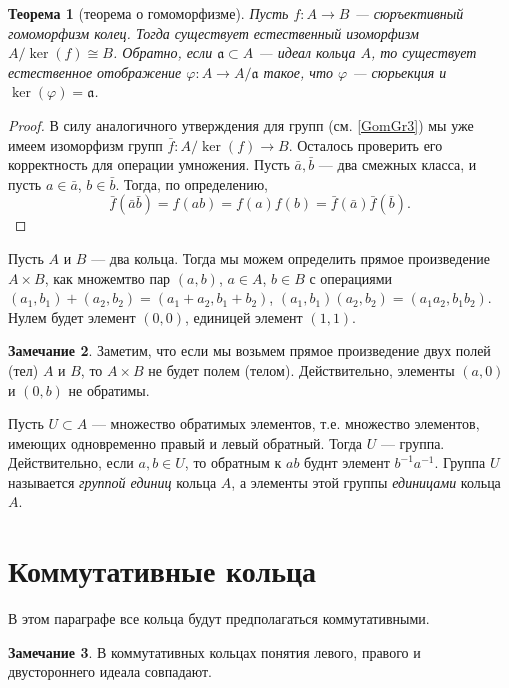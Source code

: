 \documentclass[12pt, titlepage, oneside]{amsbook}
\newcommand{\aaa}{\mathfrak{a}}
\newtheorem{theorem}{Теорема}[chapter]
\theoremstyle{definition}
\newtheorem{remark}[theorem]{Замечание}
\theoremstyle{remark}
\begin{document}
\begin{theorem}[теорема о гомоморфизме]
	\label{Kol3} Пусть $f\colon A\rightarrow B$ --- сюръективный
	гомоморфизм колец. Тогда существует естественный изоморфизм
	$A/\ker(f)\cong B$. Обратно, если $\aaa\subset A$ --- идеал кольца $A$, то существует
	естественное отображение $\varphi\colon A\rightarrow A/\aaa$ такое, что
	$\varphi$ --- сюрьекция и $\ker(\varphi)=\aaa$.
\end{theorem}

\begin{proof}
	В силу аналогичного утверждения для групп (см. \ref{GomGr3}) мы уже имеем изоморфизм групп $\bar{f}\colon A/\ker(f)\rightarrow B$. Осталось проверить его корректность для операции умножения. Пусть $\bar{a},\bar{b}$ --- два смежных класса, и пусть $a\in\bar{a}$, $b\in\bar{b}$. Тогда, по определению, $$\bar{f}(\bar{a}\bar{b})=f(ab)=f(a)f(b)=\bar{f}(\bar{a})\bar{f}(\bar{b}).$$
\end{proof}

Пусть $A$ и $B$ --- два кольца. Тогда мы можем определить прямое произведение $A\times B$, как множемтво пар $(a,b)$, $a\in A$, $b\in B$ с операциями $(a_1,b_1)+(a_2,b_2)=(a_1+a_2,b_1+b_2)$, $(a_1,b_1)(a_2,b_2)=(a_1a_2,b_1b_2)$. Нулем будет элемент $(0,0)$, единицей элемент $(1,1)$.

\begin{remark}
	Заметим, что если мы возьмем прямое произведение двух полей (тел) $A$ и $B$, то $A\times B$ не будет полем (телом). Действительно, элементы $(a,0)$ и $(0,b)$ не обратимы.
\end{remark}

Пусть $U\subset A$ --- множество обратимых элементов, т.е. множество элементов, имеющих одновременно правый и левый обратный. Тогда $U$ --- группа. Действительно, если $a,b\in U$, то обратным к $ab$ буднт элемент $b^{-1}a^{-1}$. Группа $U$ называется \emph{группой единиц} кольца $A$, а элементы этой группы \emph{единицами} кольца $A$.

\section{Коммутативные кольца}

В этом параграфе все кольца будут предполагаться коммутативными.

\begin{remark}
	В коммутативных кольцах понятия левого, правого и двустороннего идеала совпадают.
\end{remark}
\end{document}
